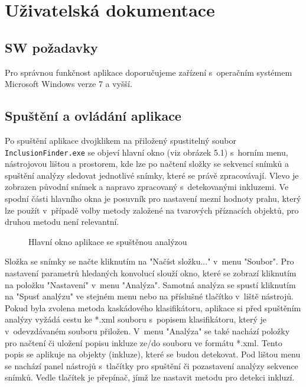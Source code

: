 \documentclass[12pt, a4paper]{report}
\begin{document}
\chapter{Uživatelská dokumentace}
	\section{SW požadavky}
	Pro správnou funkčnost aplikace doporučujeme zařízení s~operačním systémem Microsoft Windows verze 7 a vyšší.
	
	\section{Spuštění a ovládání aplikace}	
Po spuštění aplikace dvojklikem na přiložený spustitelný soubor\\ \texttt{InclusionFinder.exe} se objeví hlavní okno (viz obrázek 5.1) s~horním menu, nástrojovou lištou a prostorem, kde lze po načtení složky se sekvencí snímků a spuštění analýzy sledovat jednotlivé snímky, které se právě zpracovávají. Vlevo je zobrazen původní snímek a napravo zpracovaný s~detekovanými inkluzemi. Ve spodní části hlavního okna je posuvník pro nastavení mezní hodnoty prahu, který lze použít v~případě volby metody založené na tvarových příznacích objektů, pro druhou metodu není relevantní.

	\begin{figure}[!htb]
	\centering
	\label{fig:hlavni_okno}
	\caption{Hlavní okno aplikace se spuštěnou analýzou}
	\end{figure}

Složka se snímky se načte kliknutím na "Načíst složku..." v~menu "Soubor". Pro nastavení parametrů hledaných konvolucí slouží okno, které se zobrazí kliknutím na položku "Nastavení" v~menu "Analýza". Samotná analýza se spustí kliknutím na "Spusť analýzu" ve stejném menu nebo na příslušné tlačítko v~liště nástrojů. Pokud byla zvolena metoda kaskádového klasifikátoru, aplikace si před spuštěním analýzy vyžádá cestu ke *.xml souboru s~popisem klasifikátoru, který je v~odevzdávaném souboru přiložen. V~menu "Analýza" se také nachází položky pro načtení či uložení popisu inkluze ze/do souboru ve formátu *.xml. Tento popis se aplikuje na objekty (inkluze), které se budou detekovat. Pod lištou menu se nachází panel nástrojů s~tlačítky pro spuštění či pozastavení analýzy sekvence snímků. Vedle tlačítek je přepínač, jímž lze nastavit metodu pro detekci inkluzí.
\end{document}
